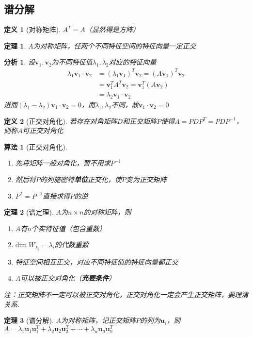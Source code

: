 \documentclass[11pt,UTF8]{ctexart}
\newtheorem{theorem}{定理}
\newtheorem{algorithm}{算法}
\newtheorem{definition}{定义}
\newtheorem*{analysis}{分析}
\def\vv{\mathbf{v}}
\def\vu{\mathbf{u}}
\begin{document}
\subsection{谱分解}
\begin{definition}[对称矩阵]
$A^T=A$（显然得是方阵）
\end{definition}
\begin{theorem}
$A$为对称矩阵，任两个不同特征空间的特征向量一定正交
\end{theorem}
\begin{analysis}
设$\vv_1,\vv_2$为不同特征值$\lambda_1,\lambda_2$对应的特征向量
\[\begin{aligned}\lambda_1\vv_1\cdot\vv_2&=(\lambda_1\vv_1)^T\vv_2=(A\vv_1)^T\vv_2\\
&=\vv_1^TA^T\vv_2=\vv_1^T(A\vv_2)\\
&=\lambda_2\vv_1\cdot\vv_2\end{aligned}\]
进而$(\lambda_1-\lambda_2)\vv_1\cdot\vv_2=0$，而$\lambda_1,\lambda_2$不同，故$\vv_1\cdot\vv_2=0$
\end{analysis}
\begin{definition}[正交对角化]
若存在对角矩阵$D$和正交矩阵$P$使得$A=PDP^T=PDP^{-1}$，则称$A$可正交对角化
\end{definition}
\begin{algorithm}[正交对角化]\mbox{}\par
\begin{enumerate}
	\itemsep -3pt
	\item 先将矩阵一般对角化，暂不用求$P^{-1}$
	\item 然后将$P$的列施密特\textbf{单位}正交化，使$P$变为正交矩阵
	\item $P^T=P^{-1}$直接求得$P$的逆
\end{enumerate}
\end{algorithm}
\begin{theorem}[谱定理]
$A$为$n\times n$的对称矩阵，则
\begin{enumerate}
	\itemsep -3pt
	\item $A$有$n$个实特征值（包含重数）
	\item $\mathrm{dim}\;W_{\lambda_i}=\lambda_i$的代数重数
	\item 特征空间相互正交，对应不同特征值的特征向量都正交
	\item $A$可以被正交对角化（\textbf{充要条件}）
\end{enumerate}
注：正交矩阵不一定可以被正交对角化，正交对角化一定会产生正交矩阵，要理清关系.
\end{theorem}
\begin{theorem}[谱分解]
$A$为对称矩阵，记正交矩阵$P$的列为$\vu_i$，则$A=\lambda_1\vu_1\vu_1^T+\lambda_2\vu_2\vu_2^T+\cdots+\lambda_n\vu_n\vu_n^T$
\end{theorem}
\end{document}
